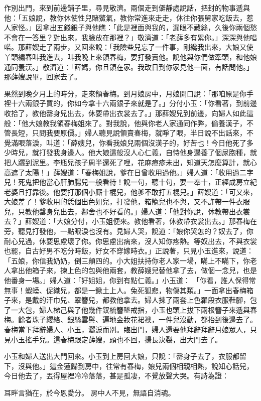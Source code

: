 作別出門，來到前邊鋪子里，尋見敬濟。兩個走到僻靜處說話，把封的物事遞與他：「五娘說，教你休使性兒賭鱉氣，教你常進來走走，休往你張舅家吃飯去，惹人家怪。」因拿出五錢銀子與他瞧：「此是裡面與我的，漏眼不藏絲，久後你兩個愁不會在一答里？對出來，我臉放在那裡？」敬濟道：「老薛多有累你。」深深與他唱喏。那薛嫂走了兩步，又回來說：「我險些兒忘了一件事，剛纔我出來，大娘又使丫頭繡春叫我進去，叫我晚上來領春梅，要打發賣他。說他與你們做牽頭，和他娘通同養漢。」敬濟道：「薛媽，你且領在家。我改日到你家見他一面，有話問他。」那薛嫂說畢，回家去了。

果然到晚夕月上的時分，走來領春梅。到月娘房中，月娘開口說：「那咱原是你手裡十六兩銀子買的，你如今拿十六兩銀子來就是了。」分付小玉：「你看著，到前邊收拾了，教他罄身兒出去，休要帶出衣裳去了。」那薛嫂兒到前邊，向婦人如此這般：「他大娘教我領春梅姐來了。對我說，他與你老人家通同作弊，偷養漢子，不管長短，只問我要原價。」婦人聽見說領賣春梅，就睜了眼，半日說不出話來，不覺滿眼落淚，叫道：「薛嫂兒，你看我娘兒兩個沒漢子的，好苦也！今日他死了多少時兒，就打發我身邊人。他大娘這般沒人心仁義，自恃他身邊養了個尿胞種，就把人躧到泥里。李瓶兒孩子周半還死了哩，花麻痘疹未出，知道天怎麼算計，就心高遮了太陽！」薛嫂道：「春梅姐說，爹在日曾收用過他。」婦人道：「收用過二字兒！死鬼把他當心肝肺腸兒一般看待！說一句，聽十句，要一奉十，正經成房立紀老婆且打靠後。他要打那個小廝十棍兒，他爹不敢打五棍兒。」薛嫂道：「可又來，大娘差了！爹收用的恁個出色姐兒，打發他，箱籠兒也不與，又不許帶一件衣服兒，只教他罄身兒出去，鄰舍也不好看的。」婦人道：「他對你說，休教帶出衣裳去？」薛嫂道：「大娘分付，小玉姐便來。教他看著，休教帶衣裳出去。」那春梅在旁，聽見打發他，一點眼淚也沒有。見婦人哭，說道：「娘你哭怎的？奴去了，你耐心兒過，休要思慮壞了你。你思慮出病來，沒人知你疼熱。等奴出去，不與衣裳也罷，自古好男不吃分時飯，好女不穿嫁時衣。」正說著，只見小玉進來，說道：「五娘，你信我奶奶，倒三顛四的。小大姐扶持你老人家一場，瞞上不瞞下，你老人拿出他箱子來，揀上色的包與他兩套，教薛嫂兒替他拿了去，做個一念兒，也是他番身一場。」婦人道：「好姐姐，你到有點仁義。」小玉道： 「你看，誰人保得常無事！蝦蟆、促織兒，都是一鍬土上人。兔死狐悲，物傷其類。」一面拿出春梅箱子來，是戴的汗巾兒、翠簪兒，都教他拿去。婦人揀了兩套上色羅段衣服鞋腳，包了一大包，婦人梯己與了他幾件釵梳簪墜戒指，小玉也頭上拔下兩根簪子來遞與春梅。餘者珠子纓絡、銀絲雲髻、遍地金妝花裙襖，一件兒沒動，都抬到後邊去了。春梅當下拜辭婦人、小玉，灑淚而別。臨出門，婦人還要他拜辭拜辭月娘眾人，只見小玉搖手兒。這春梅跟定薛嫂，頭也不回，揚長決裂，出大門去了。

小玉和婦人送出大門回來。小玉到上房回大娘，只說：「罄身子去了，衣服都留下，沒與他。」這金蓮歸到房中，往常有春梅，娘兒兩個相親相熱，說知心話兒，今日他去了，丟得屋裡冷冷落落，甚是孤凄，不覺放聲大哭。有詩為證：

耳畔言猶在，於今恩愛分。
房中人不見，無語自消魂。


